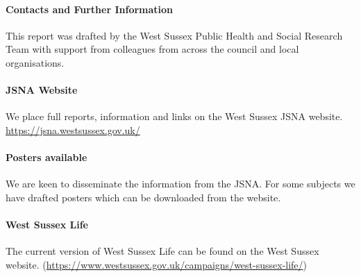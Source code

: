 \paragraph{Contacts and Further Information} This report was drafted by the West Sussex Public Health and Social Research Team with support from colleagues from across the council and local organisations.



\paragraph{JSNA Website} We place full reports, information and links on the West Sussex JSNA website. \url{https://jsna.westsussex.gov.uk/}

\paragraph{Posters available} We are keen to disseminate the information from the JSNA. For some subjects we have drafted posters which can be downloaded from the website.

\paragraph{West Sussex Life} The current version of West Sussex Life can be found on the West Sussex website. (\url{https://www.westsussex.gov.uk/campaigns/west-sussex-life/})


